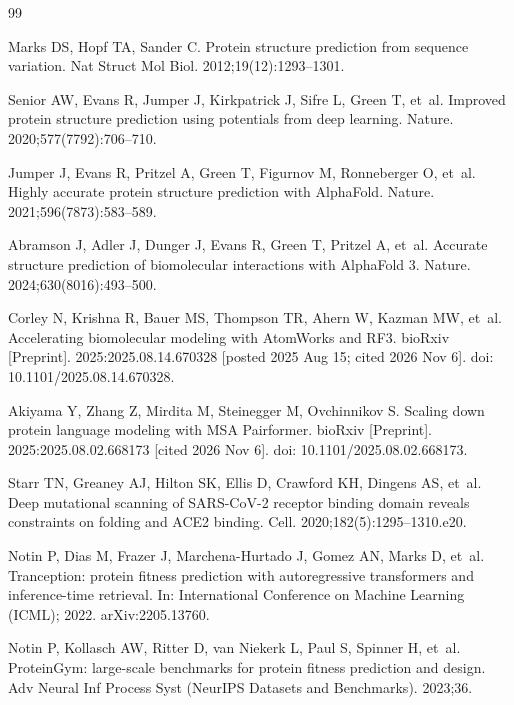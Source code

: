 \documentclass[10pt,a4paper]{article}
\begin{document}
\begin{thebibliography}{99}

Marks DS, Hopf TA, Sander C.
\newblock Protein structure prediction from sequence variation.
\newblock Nat Struct Mol Biol. 2012;19(12):1293--1301.

Senior AW, Evans R, Jumper J, Kirkpatrick J, Sifre L, Green T, et~al.
\newblock Improved protein structure prediction using potentials from deep learning.
\newblock Nature. 2020;577(7792):706--710.

Jumper J, Evans R, Pritzel A, Green T, Figurnov M, Ronneberger O, et~al.
\newblock Highly accurate protein structure prediction with AlphaFold.
\newblock Nature. 2021;596(7873):583--589.

Abramson J, Adler J, Dunger J, Evans R, Green T, Pritzel A, et~al.
\newblock Accurate structure prediction of biomolecular interactions with AlphaFold 3.
\newblock Nature. 2024;630(8016):493--500.

Corley N, Krishna R, Bauer MS, Thompson TR, Ahern W, Kazman MW, et~al.
\newblock Accelerating biomolecular modeling with AtomWorks and RF3.
\newblock bioRxiv [Preprint]. 2025:2025.08.14.670328 [posted 2025 Aug 15; cited 2026 Nov 6]. doi: 10.1101/2025.08.14.670328.

Akiyama Y, Zhang Z, Mirdita M, Steinegger M, Ovchinnikov S.
\newblock Scaling down protein language modeling with MSA Pairformer.
\newblock bioRxiv [Preprint]. 2025:2025.08.02.668173 [cited 2026 Nov 6]. doi: 10.1101/2025.08.02.668173.

Starr TN, Greaney AJ, Hilton SK, Ellis D, Crawford KH, Dingens AS, et~al.
\newblock Deep mutational scanning of SARS-CoV-2 receptor binding domain reveals constraints on folding and ACE2 binding.
\newblock Cell. 2020;182(5):1295--1310.e20.

Notin P, Dias M, Frazer J, Marchena-Hurtado J, Gomez AN, Marks D, et~al.
\newblock Tranception: protein fitness prediction with autoregressive transformers and inference-time retrieval.
\newblock In: International Conference on Machine Learning (ICML); 2022. arXiv:2205.13760.

Notin P, Kollasch AW, Ritter D, van Niekerk L, Paul S, Spinner H, et~al.
\newblock ProteinGym: large-scale benchmarks for protein fitness prediction and design.
\newblock Adv Neural Inf Process Syst (NeurIPS Datasets and Benchmarks). 2023;36.


\end{thebibliography}
\end{document}
